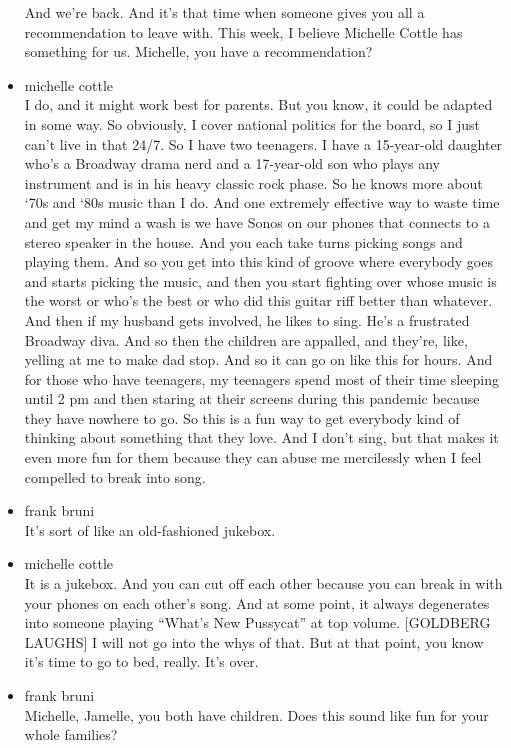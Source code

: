 \begin{itemize}
  And we're back. And it's that time when someone gives you all a
  recommendation to leave with. This week, I believe Michelle Cottle has
  something for us. Michelle, you have a recommendation?
\item
  michelle cottle\\
  I do, and it might work best for parents. But you know, it could be
  adapted in some way. So obviously, I cover national politics for the
  board, so I just can't live in that 24/7. So I have two teenagers. I
  have a 15-year-old daughter who's a Broadway drama nerd and a
  17-year-old son who plays any instrument and is in his heavy classic
  rock phase. So he knows more about `70s and `80s music than I do. And
  one extremely effective way to waste time and get my mind a wash is we
  have Sonos on our phones that connects to a stereo speaker in the
  house. And you each take turns picking songs and playing them. And so
  you get into this kind of groove where everybody goes and starts
  picking the music, and then you start fighting over whose music is the
  worst or who's the best or who did this guitar riff better than
  whatever. And then if my husband gets involved, he likes to sing. He's
  a frustrated Broadway diva. And so then the children are appalled, and
  they're, like, yelling at me to make dad stop. And so it can go on
  like this for hours. And for those who have teenagers, my teenagers
  spend most of their time sleeping until 2 pm and then staring at their
  screens during this pandemic because they have nowhere to go. So this
  is a fun way to get everybody kind of thinking about something that
  they love. And I don't sing, but that makes it even more fun for them
  because they can abuse me mercilessly when I feel compelled to break
  into song.
\item
  frank bruni\\
  It's sort of like an old-fashioned jukebox.
\item
  michelle cottle\\
  It is a jukebox. And you can cut off each other because you can break
  in with your phones on each other's song. And at some point, it always
  degenerates into someone playing ``What's New Pussycat'' at top
  volume. {[}GOLDBERG LAUGHS{]} I will not go into the whys of that. But
  at that point, you know it's time to go to bed, really. It's over.
\item
  frank bruni\\
  Michelle, Jamelle, you both have children. Does this sound like fun
  for your whole families?

\end{itemize}
